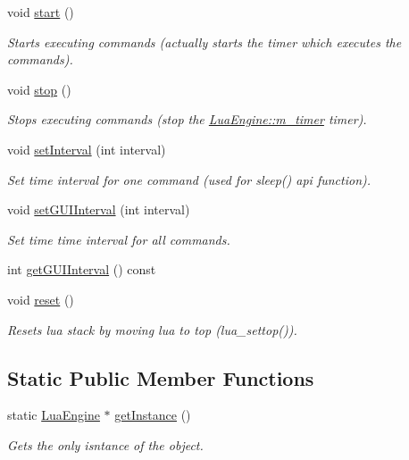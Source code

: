 \begin{DoxyCompactItemize}
void \hyperlink{class_lua_engine_a28e0795b54170d763a929256566fe2b5}{start} ()
\begin{DoxyCompactList}\small\item\em Starts executing commands (actually starts the timer which executes the commands). \end{DoxyCompactList}\item 
void \hyperlink{class_lua_engine_a5822af655fb7b474766e39b44be56a6a}{stop} ()
\begin{DoxyCompactList}\small\item\em Stops executing commands (stop the \hyperlink{class_lua_engine_a367284a1461c5a2d2804c3f9b4d94f14}{Lua\-Engine\-::m\-\_\-timer} timer). \end{DoxyCompactList}\item 
void \hyperlink{class_lua_engine_a0b87a8b474070665af6e435a2c5bce56}{set\-Interval} (int interval)
\begin{DoxyCompactList}\small\item\em Set time interval for one command (used for sleep() api function). \end{DoxyCompactList}\item 
void \hyperlink{class_lua_engine_ac29f2b09b45797aac68bd5caa6fe2c90}{set\-G\-U\-I\-Interval} (int interval)
\begin{DoxyCompactList}\small\item\em Set time time interval for all commands. \end{DoxyCompactList}\item 
int \hyperlink{class_lua_engine_a613b53ffedc45c8cf800e99aa42408c5}{get\-G\-U\-I\-Interval} () const 
\item 
void \hyperlink{class_lua_engine_ab598de2b82cdf3ea3c67244669a31194}{reset} ()
\begin{DoxyCompactList}\small\item\em Resets lua stack by moving lua to top (lua\-\_\-settop()). \end{DoxyCompactList}\end{DoxyCompactItemize}
\subsection*{Static Public Member Functions}
\begin{DoxyCompactItemize}
\item 
static \hyperlink{class_lua_engine}{Lua\-Engine} $\ast$ \hyperlink{class_lua_engine_aded58f5432b1e6598ad3c82ea2e5c0b4}{get\-Instance} ()
\begin{DoxyCompactList}\small\item\em Gets the only isntance of the object. \end{DoxyCompactList}\end{DoxyCompactItemize}
